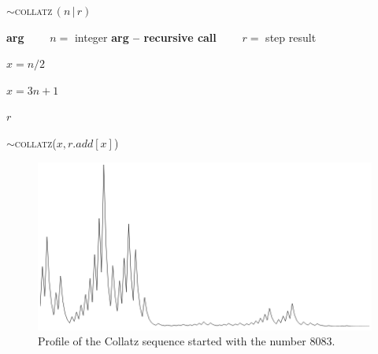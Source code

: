 \begin{algorithm}
\caption{$\sim$\textsc{collatz}$\,(n \,|\, r)$}\label{collatz}
\begin{algorithmic}%

\State \textbf{arg}
\State $\qquad n=$ integer
\State \textbf{arg -- recursive call}
\State $\qquad r=$ step result
\State


$x=n/2$

\Else 

$x=3n+1$
\EndIf
\State
{} 

\Return $r$

\Else

$\sim$\textsc{collatz}($x,r.add[x]$)
\EndIf

\end{algorithmic}
\end{algorithm}

\begin{figure}[H]
\begin{center}
\includegraphics[scale=0.46]{img/8083.png}
\caption{Profile of the Collatz sequence started with the number 8083.}
\label{coltz}
\end{center}
\end{figure}



